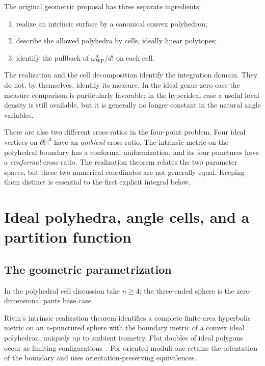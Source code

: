 \documentclass[11pt,a4paper]{article}
\numberwithin{equation}{section}
\theoremstyle{definition}
\theoremstyle{remark}
\newcommand{\WP}{\mathrm{WP}}
\newcommand{\HH}{\mathbb H}
\begin{document}
The original geometric proposal has three separate ingredients:
\begin{enumerate}
 \item realize an intrinsic surface by a canonical convex polyhedron;
 \item describe the allowed polyhedra by cells, ideally linear polytopes;
 \item identify the pullback of $\omega_{\WP}^{d}/d!$ on each cell.
\end{enumerate}
The realization and the cell decomposition identify the integration domain.
They do not, by themselves, identify its measure. In the ideal genus-zero
case the measure comparison is particularly favorable; in the hyperideal
case a useful local density is still available, but it is generally no longer
constant in the natural angle variables.

There are also two different cross-ratios in the four-point problem. Four
ideal vertices on $\partial\HH^3$ have an \emph{ambient} cross-ratio. The
intrinsic metric on the polyhedral boundary has a conformal uniformization,
and its four punctures have a \emph{conformal} cross-ratio. The realization
theorem relates the two parameter spaces, but these two numerical coordinates
are not generally equal. Keeping them distinct is essential to the first
explicit integral below.

\section{Ideal polyhedra, angle cells, and a partition function}
\label{sec:idealcells}

\subsection{The geometric parametrization}

In the polyhedral cell discussion take $n\ge4$; the three-ended sphere is
the zero-dimensional pants base case.

Rivin's intrinsic realization theorem identifies a complete finite-area
hyperbolic metric on an $n$-punctured sphere with the boundary metric of a
convex ideal polyhedron, uniquely up to ambient isometry. Flat doubles of
ideal polygons occur as limiting configurations~\cite{RivinIntrinsic}.
For oriented moduli one retains the orientation of the boundary and uses
orientation-preserving equivalences.
\end{document}
